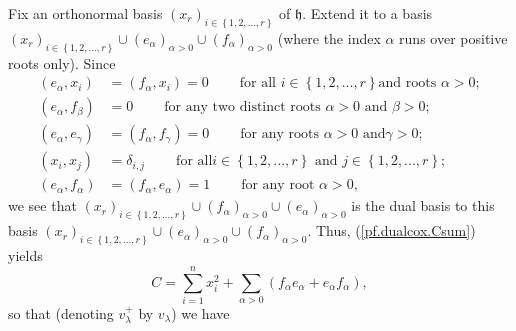 \documentclass
[numbers=enddot,12pt,final,onecolumn,german,notitlepage]{scrartcl}%
\theoremstyle{definition}
\begin{document}
Fix an orthonormal basis $\left(  x_{r}\right)  _{i\in\left\{
1,2,...,r\right\}  }$ of $\mathfrak{h}$. Extend it to a basis $\left(
x_{r}\right)  _{i\in\left\{  1,2,...,r\right\}  }\cup\left(  e_{\alpha
}\right)  _{\alpha>0}\cup\left(  f_{\alpha}\right)  _{\alpha>0}$ (where the
index $\alpha$ runs over positive roots only). Since%
\begin{align*}
\left(  e_{\alpha},x_{i}\right)   &  =\left(  f_{\alpha},x_{i}\right)
=0\ \ \ \ \ \ \ \ \ \ \text{for all }i\in\left\{  1,2,...,r\right\}  \text{
and roots }\alpha>0;\\
\left(  e_{\alpha},f_{\beta}\right)   &  =0\ \ \ \ \ \ \ \ \ \ \text{for any
two distinct roots }\alpha>0\text{ and }\beta>0;\\
\left(  e_{\alpha},e_{\gamma}\right)   &  =\left(  f_{\alpha},f_{\gamma
}\right)  =0\ \ \ \ \ \ \ \ \ \ \text{for any roots }\alpha>0\text{ and
}\gamma>0;\\
\left(  x_{i},x_{j}\right)   &  =\delta_{i,j}\ \ \ \ \ \ \ \ \ \ \text{for all
}i\in\left\{  1,2,...,r\right\}  \text{ and }j\in\left\{  1,2,...,r\right\}
;\\
\left(  e_{\alpha},f_{\alpha}\right)   &  =\left(  f_{\alpha},e_{\alpha
}\right)  =1\ \ \ \ \ \ \ \ \ \ \text{for any root }\alpha>0\text{,}%
\end{align*}
we see that $\left(  x_{r}\right)  _{i\in\left\{  1,2,...,r\right\}  }%
\cup\left(  f_{\alpha}\right)  _{\alpha>0}\cup\left(  e_{\alpha}\right)
_{\alpha>0}$ is the dual basis to this basis $\left(  x_{r}\right)
_{i\in\left\{  1,2,...,r\right\}  }\cup\left(  e_{\alpha}\right)  _{\alpha
>0}\cup\left(  f_{\alpha}\right)  _{\alpha>0}$. Thus, (\ref{pf.dualcox.Csum})
yields%
\[
C=\sum\limits_{i=1}^{n}x_{i}^{2}+\sum\limits_{\alpha>0}\left(  f_{\alpha
}e_{\alpha}+e_{\alpha}f_{\alpha}\right)  ,
\]
so that (denoting $v_{\lambda}^{+}$ by $v_{\lambda}$) we have%
\end{document}
